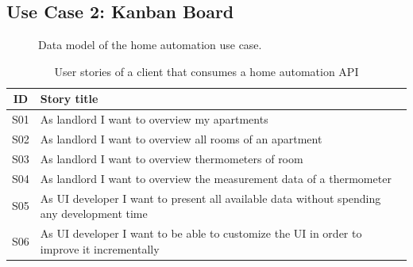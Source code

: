 \subsection{Use Case 2: Kanban Board}\label{usecases}

\begin{figure}[!htb]
  \caption{\label{fig:my-label} Data model of the home automation use case.}
\end{figure}

\begin{table}
\begin{center}
\begin{tabular}{ |c|l| }
 \hline
 ID & Story title \\
 \hline
 S01 & As landlord I want to overview my apartments \\
 S02 & As landlord I want to overview all rooms of an apartment \\
 S03 & As landlord I want to overview thermometers of room \\
 S04 & As landlord I want to overview the measurement data of a thermometer \\
 S05 & As UI developer I want to present all available data without spending any development time \\
 S06 & As UI developer I want to be able to customize the UI in order to improve it incrementally \\
 \hline
\end{tabular}
\caption{User stories of a client that consumes a home automation API}
\end{center}
\end{table}

